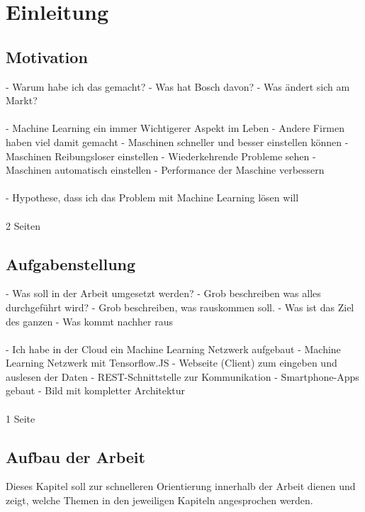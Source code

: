 \chapter{Einleitung}
\label{ch:einleitung}

\section{Motivation}
\label{sec:motivation}
- Warum habe ich das gemacht?
- Was hat Bosch davon?
- Was ändert sich am Markt?
\\ \\
- Machine Learning ein immer Wichtigerer Aspekt im Leben
- Andere Firmen haben viel damit gemacht
- Maschinen schneller und besser einstellen können
- Maschinen Reibungsloser einstellen
- Wiederkehrende Probleme sehen
- Maschinen automatisch einstellen
- Performance der Maschine verbessern
\\ \\
- Hypothese, dass ich das Problem mit Machine Learning lösen will
\\ \\
2 Seiten

\section{Aufgabenstellung}
\label{sec:aufgabenstellung}
- Was soll in der Arbeit umgesetzt werden?
- Grob beschreiben was alles durchgeführt wird?
- Grob beschreiben, was rauskommen soll.
- Was ist das Ziel des ganzen
- Was kommt nachher raus
\\ \\
- Ich habe in der Cloud ein Machine Learning Netzwerk aufgebaut
- Machine Learning Netzwerk mit Tensorflow.JS
- Webseite (Client) zum eingeben und auslesen der Daten
- REST-Schnittstelle zur Kommunikation
- Smartphone-Apps gebaut
- Bild mit kompletter Architektur
\\ \\
1 Seite

\newpage

\section{Aufbau der Arbeit}
\label{sec:aufbauDerArbeit}
Dieses Kapitel soll zur schnelleren Orientierung innerhalb der Arbeit dienen und zeigt, welche Themen in den jeweiligen
Kapiteln angesprochen werden.

